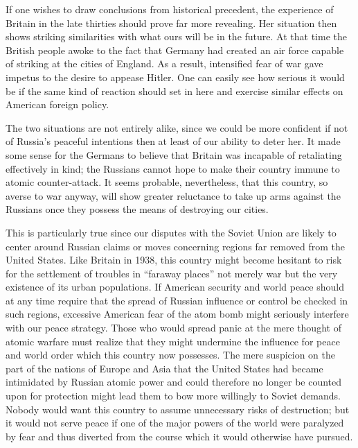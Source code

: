 If one wishes to draw conclusions from historical precedent, the experience of Britain in the late thirties should prove far more revealing. Her situation then shows striking similarities with what ours will be in the future. At that time the British people awoke to the fact that Germany had created an air force capable of striking at the cities of England. As a result, intensified fear of war gave impetus to the desire to appease Hitler. One can easily see how serious it would be if the same kind of reaction should set in here and exercise similar effects on American foreign policy.

The two situations are not entirely alike, since we could be more confident if not of Russia's peaceful intentions then at least of our ability to deter her. It made some sense for the Germans to believe that Britain was incapable of retaliating effectively in kind; the Russians cannot hope to make their country immune to atomic counter-attack. It seems probable, nevertheless, that this country, so averse to war anyway, will show greater reluctance to take up arms against the Russians once they possess the means of destroying our cities.

This is particularly true since our disputes with the Soviet Union are likely to center around Russian claims or moves concerning regions far removed from the United States. Like Britain in 1938, this country might become hesitant to risk for the settlement of troubles in ``faraway places'' not merely war but the very existence of its urban populations. If American security and world peace should at any time require that the spread of Russian influence or control be checked in such regions, excessive American fear of the atom bomb might seriously interfere with our peace strategy. Those who would spread panic at the mere thought of atomic warfare must realize that they might undermine the influence for peace and world order which this country now possesses. The mere suspicion on the part of the nations of Europe and Asia that the United States had became intimidated by Russian atomic power and could therefore no longer be counted upon for protection might lead them to bow more willingly to Soviet demands. Nobody would want this country to assume unnecessary risks of destruction; but it would not serve peace if one of the major powers of the world were paralyzed by fear and thus diverted from the course which it would otherwise have pursued.

